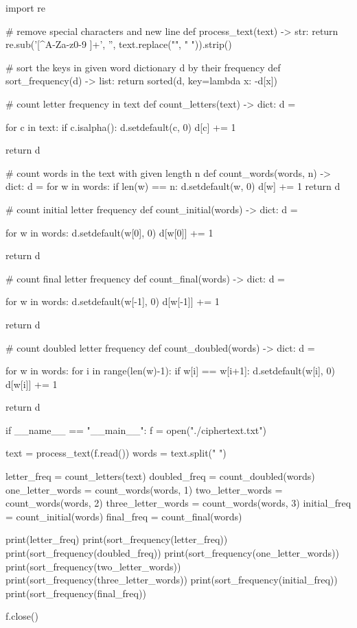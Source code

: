 \documentclass{article}
\begin{document}
\begin{python}
import re


# remove special characters and new line
def process_text(text) -> str:
    return re.sub('[^A-Za-z0-9 ]+', '', text.replace("\n", " ")).strip()


# sort the keys in given word dictionary d by their frequency
def sort_frequency(d) -> list:
    return sorted(d, key=lambda x: -d[x])


# count letter frequency in text
def count_letters(text) -> dict:
    d = {}

    for c in text:
        if c.isalpha():
            d.setdefault(c, 0)
            d[c] += 1

    return d


# count words in the text with given length n
def count_words(words, n) -> dict:
    d = {}
    for w in words:
        if len(w) == n:
            d.setdefault(w, 0)
            d[w] += 1
    return d


# count initial letter frequency
def count_initial(words) -> dict:
    d = {}

    for w in words:
        d.setdefault(w[0], 0)
        d[w[0]] += 1

    return d


# count final letter frequency
def count_final(words) -> dict:
    d = {}

    for w in words:
        d.setdefault(w[-1], 0)
        d[w[-1]] += 1

    return d


# count doubled letter frequency
def count_doubled(words) -> dict:
    d = {}

    for w in words:
        for i in range(len(w)-1):
            if w[i] == w[i+1]:
                d.setdefault(w[i], 0)
                d[w[i]] += 1

    return d


if __name__ == "__main__":
    f = open("./ciphertext.txt")

    text = process_text(f.read())
    words = text.split(" ")

    letter_freq = count_letters(text)
    doubled_freq = count_doubled(words)
    one_letter_words = count_words(words, 1)
    two_letter_words = count_words(words, 2)
    three_letter_words = count_words(words, 3)
    initial_freq = count_initial(words)
    final_freq = count_final(words)

    print(letter_freq)
    print(sort_frequency(letter_freq))
    print(sort_frequency(doubled_freq))
    print(sort_frequency(one_letter_words))
    print(sort_frequency(two_letter_words))
    print(sort_frequency(three_letter_words))
    print(sort_frequency(initial_freq))
    print(sort_frequency(final_freq))

    f.close()
\end{python}
\end{document}
